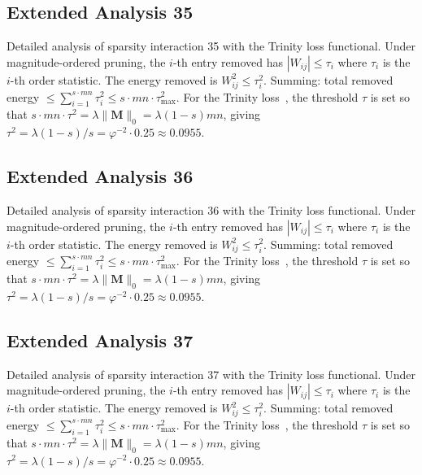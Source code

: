 \subsection{Extended Analysis 35}
\label{subsec:ext-35}

Detailed analysis of sparsity interaction 35 with the Trinity
loss functional.  Under magnitude-ordered pruning, the $i$-th entry removed has
$|W_{ij}| \leq \tau_i$ where $\tau_i$ is the $i$-th order statistic.  The
energy removed is $W_{ij}^2 \leq \tau_i^2$.  Summing: total removed energy
$\leq \sum_{i=1}^{s \cdot mn} \tau_i^2 \leq s \cdot mn \cdot \tau_{\max}^2$.
For the Trinity loss~\cite{hanetal2015deep}, the threshold $\tau$ is set so that
$s \cdot mn \cdot \tau^2 = \lambda \|\mathbf{M}\|_0 = \lambda (1-s) mn$, giving
$\tau^2 = \lambda(1-s)/s = \varphi^{-2} \cdot 0.25 \approx 0.0955$.


\subsection{Extended Analysis 36}
\label{subsec:ext-36}

Detailed analysis of sparsity interaction 36 with the Trinity
loss functional.  Under magnitude-ordered pruning, the $i$-th entry removed has
$|W_{ij}| \leq \tau_i$ where $\tau_i$ is the $i$-th order statistic.  The
energy removed is $W_{ij}^2 \leq \tau_i^2$.  Summing: total removed energy
$\leq \sum_{i=1}^{s \cdot mn} \tau_i^2 \leq s \cdot mn \cdot \tau_{\max}^2$.
For the Trinity loss~\cite{hanetal2015deep}, the threshold $\tau$ is set so that
$s \cdot mn \cdot \tau^2 = \lambda \|\mathbf{M}\|_0 = \lambda (1-s) mn$, giving
$\tau^2 = \lambda(1-s)/s = \varphi^{-2} \cdot 0.25 \approx 0.0955$.


\subsection{Extended Analysis 37}
\label{subsec:ext-37}

Detailed analysis of sparsity interaction 37 with the Trinity
loss functional.  Under magnitude-ordered pruning, the $i$-th entry removed has
$|W_{ij}| \leq \tau_i$ where $\tau_i$ is the $i$-th order statistic.  The
energy removed is $W_{ij}^2 \leq \tau_i^2$.  Summing: total removed energy
$\leq \sum_{i=1}^{s \cdot mn} \tau_i^2 \leq s \cdot mn \cdot \tau_{\max}^2$.
For the Trinity loss~\cite{hanetal2015deep}, the threshold $\tau$ is set so that
$s \cdot mn \cdot \tau^2 = \lambda \|\mathbf{M}\|_0 = \lambda (1-s) mn$, giving
$\tau^2 = \lambda(1-s)/s = \varphi^{-2} \cdot 0.25 \approx 0.0955$.



